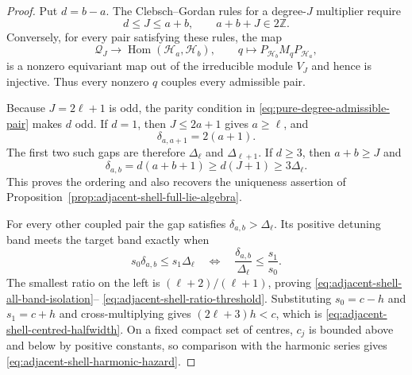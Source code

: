 \documentclass[11pt]{article}
\theoremstyle{remark}
\begin{document}
\begin{proof}
Put $d=b-a$.  The Clebsch--Gordan rules for a degree-$J$ multiplier require
\begin{equation}
 d\leq J\leq a+b,\qquad a+b+J\in2\mathbb Z.
 \label{eq:pure-degree-admissible-pair}
\end{equation}
Conversely, for every pair satisfying these rules, the map
\[
 \mathcal Q_J\longrightarrow
 \operatorname{Hom}(\mathcal H_a,\mathcal H_b),\qquad
 q\longmapsto P_{\mathcal H_b}M_qP_{\mathcal H_a},
\]
is a nonzero equivariant map out of the irreducible module $V_J$ and hence is
injective.  Thus every nonzero $q$ couples every admissible pair.

Because $J=2\ell+1$ is odd, the parity condition in
\eqref{eq:pure-degree-admissible-pair} makes $d$ odd.  If $d=1$, then
$J\leq2a+1$ gives $a\geq\ell$, and
\[
 \delta_{a,a+1}=2(a+1).
\]
The first two such gaps are therefore $\Delta_\ell$ and
$\Delta_{\ell+1}$.  If $d\geq3$, then $a+b\geq J$ and
\[
 \delta_{a,b}
 =d(a+b+1)
 \geq d(J+1)
 \geq3\Delta_\ell.
\]
This proves the ordering and also recovers the uniqueness assertion of
Proposition~\ref{prop:adjacent-shell-full-lie-algebra}.

For every other coupled pair the gap satisfies
$\delta_{a,b}>\Delta_\ell$.  Its positive detuning band meets the target band
exactly when
\[
 s_0\delta_{a,b}\leq s_1\Delta_\ell
 \quad\Longleftrightarrow\quad
 \frac{\delta_{a,b}}{\Delta_\ell}\leq\frac{s_1}{s_0}.
\]
The smallest ratio on the left is
$(\ell+2)/(\ell+1)$, proving
\eqref{eq:adjacent-shell-all-band-isolation}--%
\eqref{eq:adjacent-shell-ratio-threshold}.  Substituting
$s_0=c-h$ and $s_1=c+h$ and cross-multiplying gives
$(2\ell+3)h<c$, which is
\eqref{eq:adjacent-shell-centred-halfwidth}.  On a fixed compact set of
centres, $c_j$ is bounded above and below by positive constants, so comparison
with the harmonic series gives
\eqref{eq:adjacent-shell-harmonic-hazard}.
\end{proof}
\end{document}
